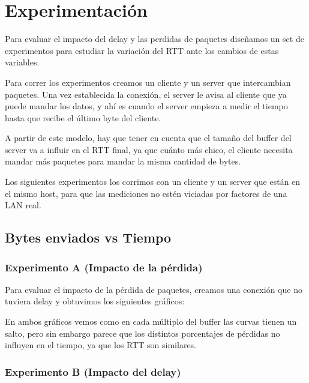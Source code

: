 \section{Experimentaci\'on}

Para evaluar el impacto del delay y las perdidas de paquetes dise\~namos un set de experimentos para estudiar la variaci\'on del RTT ante los cambios de estas variables. 

Para correr los experimentos creamos un cliente y un server que intercambian paquetes. Una vez establecida la conexi\'on, el server le avisa al cliente que ya puede mandar los datos, y ah\'i es cuando el server empieza a medir el tiempo hasta que recibe el \'ultimo byte del cliente. 

A partir de este modelo, hay que tener en cuenta que el tama\~no del buffer del server va a influir en el RTT final, ya que cu\'anto m\'as chico, el cliente necesita mandar m\'as paquetes para mandar la misma cantidad de bytes. 

Los siguientes experimentos los corrimos con un cliente y un server que est\'an en el mismo host, para que las mediciones no est\'en viciadas por factores de una LAN real.

\subsection{Bytes enviados vs Tiempo}
\subsubsection{Experimento A (Impacto de la p\'erdida)}

  Para evaluar el impacto de la p\'erdida de paquetes, creamos una conexi\'on que no tuviera delay y obtuvimos los siguientes gr\'aficos: 
  


  En ambos gr\'aficos vemos como en cada m\'ultiplo del buffer las curvas tienen un salto, pero sin embargo parece que los distintos porcentajes de p\'erdidas no influyen en el tiempo, ya que los RTT son similares. 
  
\subsubsection{Experimento B (Impacto del delay)} 

